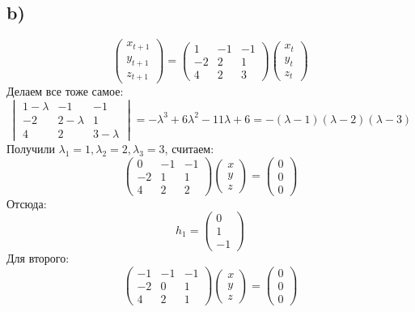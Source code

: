 \documentclass[a4paper,12pt]{article}
\begin{document}
\subsection*{b)}
\[
\begin{pmatrix}
x_{t + 1} \\
y_{t + 1} \\
z_{t + 1} 
\end{pmatrix}
=
\begin{pmatrix}
1 & -1 & -1 \\
-2 & 2& 1 \\
4 & 2  & 3 
\end{pmatrix}
\begin{pmatrix}
x_{t } \\
y_{t} \\
z_{t } 
\end{pmatrix}
\]
Делаем все тоже самое:
 \[
\begin{vmatrix}
1 - \lambda & -1 & -1 \\
-2 & 2 - \lambda& 1 \\
4 & 2  & 3 - \lambda 
\end{vmatrix} = -\lambda^3 + 6\lambda^2 - 11 \lambda + 6 = -(\lambda -1)(\lambda -2)(\lambda -3)
\]
Получили $\lambda_1 = 1, \lambda_2 = 2, \lambda_3 =3 $, считаем:
\[
\begin{pmatrix}
0& -1 & -1 \\
-2 &1& 1 \\
4 & 2  & 2
\end{pmatrix}
\begin{pmatrix}
x \\
y \\
z 
\end{pmatrix} = 
\begin{pmatrix}
0 \\ 0 \\ 0
\end{pmatrix}
\] 
Отсюда:
\[
h_1 = \begin{pmatrix}
0 \\ 1 \\ -1
\end{pmatrix}
\]
Для второго:
\[
\begin{pmatrix}
-1& -1 & -1 \\
-2 &0& 1 \\
4 & 2  & 1
\end{pmatrix}
\begin{pmatrix}
x \\
y \\
z 
\end{pmatrix}  = 
\begin{pmatrix}
0 \\ 0 \\ 0
\end{pmatrix}
\]
\end{document}
